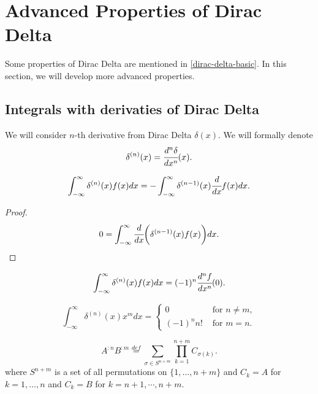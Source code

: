 \documentclass[main.tex]{subfiles}
\begin{document}
\section{Advanced Properties of Dirac Delta}
Some properties of Dirac Delta are mentioned in \ref{dirac-delta-basic}. In this section, we will develop more advanced properties.

\subsection{Integrals with derivaties of Dirac Delta}
We will consider $n$-th derivative from Dirac Delta $\delta(x)$. We will formally denote
\begin{equation}
\delta^{(n)}(x) = \cfrac{d^n \delta}{dx^n}(x).
\end{equation} 

\begin{lemma}
\begin{equation}
\int_{-\infty}^{\infty} \delta^{(n)}(x) f(x)dx = - \int_{-\infty}^{\infty} \delta^{(n - 1)}(x) \cfrac{d}{dx}f(x)dx. 
\end{equation}
\end{lemma}
\begin{proof}
\begin{equation}
0 = \int_{-\infty}^{\infty} \cfrac{d}{dx}\bigg( \delta^{(n - 1)}(x) f(x)\bigg) dx.
\end{equation}
\end{proof}

\begin{corollary}
\begin{equation}
\int_{-\infty}^{\infty} \delta^{(n)}(x) f(x)dx = (-1)^n \cfrac{d^n f}{dx^n}(0).
\end{equation}
\end{corollary}

\begin{corollary}
\begin{equation}
\int_{-\infty}^{\infty} \delta^{(n)}(x) x^m dx = 
\begin{cases}
0 &\text{ for } n\not=m,\\
(-1)^n n! &\text{ for } m = n.
\end{cases}
\end{equation}
\end{corollary}

\begin{definition}
\begin{equation}
A^{:n} B^{:m} \stackrel{def}{=} \sum_{\sigma\in S^{n + m}} \prod_{k = 1}^{n + m} C_{\sigma(k)}.
\end{equation}
where $S^{n + m}$ is a set of all permutations on $\{1, \dots, n + m\}$ and
$C_k = A$ for $k = 1, \dots, n$ and $C_k = B$ for $k = n + 1, \cdots, n + m$.
\end{definition}
\end{document}
